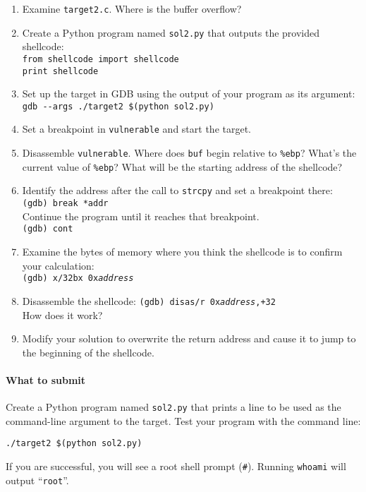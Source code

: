 \documentclass[letterpaper,12pt]{report}
\begin{document}
{\begin{enumerate}
\item Examine \texttt{target2.c}.  Where is the buffer overflow?
\item Create a Python program named \texttt{sol2.py} that outputs the provided shellcode:\\
\texttt{from shellcode import shellcode}\\
\texttt{print shellcode}
\item Set up the target in GDB using the output of your program as its argument:\\
\texttt{gdb -{}-args ./target2 \$(python sol2.py)}
\item Set a breakpoint in \texttt{vulnerable} and start the target.
\item Disassemble \texttt{vulnerable}.  Where does \texttt{buf} begin relative to \texttt{\%ebp}?  What's the current value of \texttt{\%ebp}?  What will be the starting address of the shellcode?
\item Identify the address after the call to \texttt{strcpy} and set a breakpoint there:\\
\texttt{(gdb) break *addr}\\
Continue the program until it reaches that breakpoint.\\
\texttt{(gdb) cont}
\item Examine the bytes of memory where you think the shellcode is to confirm your calculation:\\
\texttt{(gdb) x/32bx 0x\emph{address}}
\item Disassemble the shellcode:  \texttt{(gdb) disas/r 0x\emph{address},+32}\\
  How does it work?
\item Modify your solution to overwrite the return address and cause it to jump to the beginning of the shellcode.
\end{enumerate}

\paragraph{What to submit}
Create a Python program named \texttt{sol2.py} that prints a line to be used as the command-line argument to the target.  Test your program with the command line:

\smallskip

\quad\texttt{./target2 \$(python sol2.py)}

\medskip

If you are successful, you will see a root shell prompt (\texttt{\#}).  Running \texttt{whoami} will output ``\texttt{root}''.

}
\end{document}
